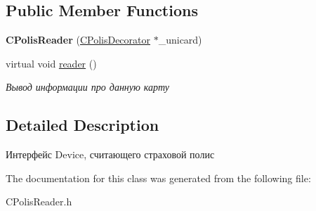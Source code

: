 \subsection*{Public Member Functions}
\begin{DoxyCompactItemize}
\item 
\mbox{\label{classCPolisReader_a8adfeca19ec5f6919209ca579f1e5cf3}} 
{\bfseries C\+Polis\+Reader} (\hyperlink{classCPolisDecorator}{C\+Polis\+Decorator} $\ast$\+\_\+unicard)
\item 
\mbox{\label{classCPolisReader_a8c56b8c31bb1587d7cd4cc0225eaa41e}} 
virtual void \hyperlink{classCPolisReader_a8c56b8c31bb1587d7cd4cc0225eaa41e}{reader} ()
\begin{DoxyCompactList}\small\item\em Вывод информации про данную карту \end{DoxyCompactList}\end{DoxyCompactItemize}


\subsection{Detailed Description}
Интерфейс Device, считающего страховой полис 

The documentation for this class was generated from the following file\+:\begin{DoxyCompactItemize}
\item 
C\+Polis\+Reader.\+h\end{DoxyCompactItemize}
